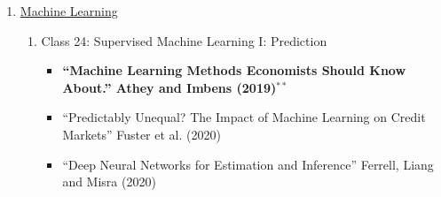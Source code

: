 \documentclass[11pt, a4paper]{article}
\begin{document}
\begin{enumerate}
\begin{enumerate}
\begin{itemize}
    \item ``Inference on causal effects in a generalized regression kink design'' Card et al. (2015)
    \item ``Robust nonparametric confidence intervals for regression-discontinuity designs'' Calanico et al. (2014)
    \item ``Regression discontinuity designs using covariates'' Calanico et al (2019)
    \item  ``Investment and financing constraints: Evidence from the funding of corporate pension plans'' Rauh (2006)
    \item ``Threshold Events and Identification: A Study of Cash Shortfalls'' Bakke and WHited (2012)
    \end{itemize}
  \item Class 22: Regression Discontinuity II: The Checklist
  \item Class 23: Regression Discontinuity III: Extensions
    \begin{itemize}
    \item ``Approximate Permutation Tests and Induced Order Statistics in the Regression Discontinuity Design'', Canay and Kamat (2017)
    \item ``Manipulation of the running variable in the regression discontinuity design: A density test'', McCrary (2008)
    \item ``External Validity in Fuzzy Regression Discontinuity Designs'', Bertanha and Imbens (2019)
    \item \textbf{``Bounds on treatment effects in regression discontinuity designs with a manipulated running variable'', Gerard, Rokkanen and Rothe (2020)}$^{**}$
    \item ``A Simple Adjustment for Bandwidth Snooping'', Armstrong and Kolesar (2018)
    \end{itemize}
  \end{enumerate}
\item \underline{Machine Learning}
  \begin{enumerate}
  \item Class 24: Supervised Machine Learning I: Prediction
    \begin{itemize}
    \item \textbf{``Machine Learning Methods Economists Should Know About.'' Athey and Imbens (2019)}$^{**}$
    \item ``Predictably Unequal? The Impact of Machine Learning on Credit Markets'' Fuster et al. (2020)
    \item ``Deep Neural Networks for Estimation and Inference'' Ferrell, Liang and Misra (2020)

\end{itemize}
\end{enumerate}
\end{enumerate}
\end{document}

